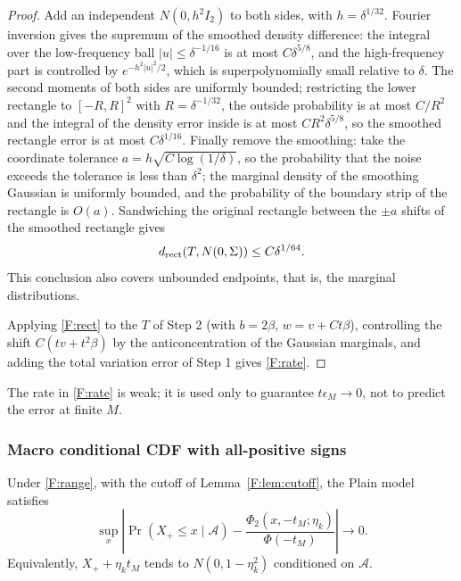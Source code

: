 \begin{proof}
Add an independent $N(0,h^2I_2)$ to both sides, with $h=\delta^{1/32}$. Fourier inversion gives
the supremum of the smoothed density difference: the integral over the low-frequency ball
$|u|\le\delta^{-1/16}$ is at most $C\delta^{5/8}$, and the high-frequency part is controlled by
$e^{-h^2|u|^2/2}$, which is superpolynomially small relative to $\delta$. The second moments of
both sides are uniformly bounded; restricting the lower rectangle to $[-R,R]^2$ with
$R=\delta^{-1/32}$, the outside probability is at most $C/R^2$ and the integral of the density
error inside is at most $CR^2\delta^{5/8}$, so the smoothed rectangle error is at most
$C\delta^{1/16}$. Finally remove the smoothing: take the coordinate tolerance
$a=h\sqrt{C\log(1/\delta)}$, so the probability that the noise exceeds the tolerance is less than
$\delta^2$; the marginal density of the smoothing Gaussian is uniformly bounded, and the
probability of the boundary strip of the rectangle is $O(a)$. Sandwiching the original rectangle
between the $\pm a$ shifts of the smoothed rectangle gives
\begin{equation}
d_{\rm rect}(T,N(0,\Sigma))\le C\delta^{1/64}.\label{F:rect}
\end{equation}
This conclusion also covers unbounded endpoints, that is, the marginal distributions.

Applying \eqref{F:rect} to the $T$ of Step 2 (with $b=2\beta$, $w=v+Ct\beta$), controlling the
shift $C(tv+t^2\beta)$ by the anticoncentration of the Gaussian marginals, and adding the total
variation error of Step 1 gives \eqref{F:rate}.
\end{proof}

\begin{remark}
The rate in \eqref{F:rate} is weak; it is used only to guarantee $t\epsilon_M\to0$, not to
predict the error at finite $M$.
\end{remark}

\subsubsection{Macro conditional CDF with all-positive signs}

\begin{proposition}\label{F:prop:cdf}
Under \eqref{F:range}, with the cutoff of Lemma~\ref{F:lem:cutoff}, the Plain model satisfies
\begin{equation}
\sup_x\left|\Pr(X_+\le x\mid \mathcal A)-\frac{\Phi_2(x,-t_M;\eta_k)}{\Phi(-t_M)}\right|\to0.\label{F:cdf}
\end{equation}
Equivalently, $X_++\eta_kt_M$ tends to $N(0,1-\eta_k^2)$ conditioned on $\mathcal A$.
\end{proposition}

